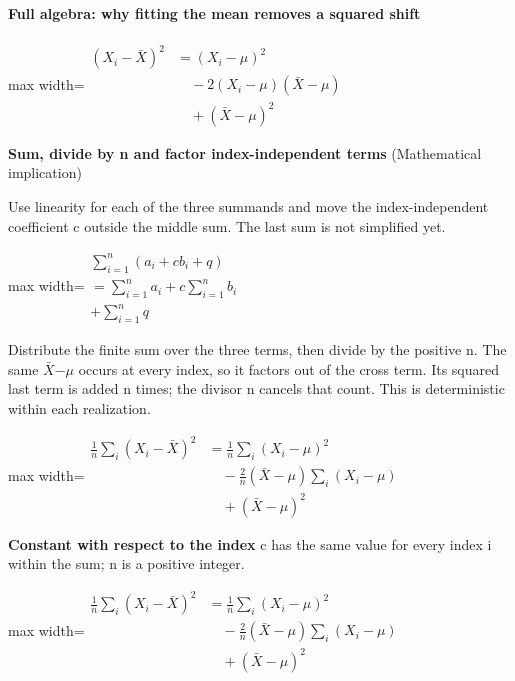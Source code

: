 \documentclass[11pt,a4paper]{article}
\begin{document}
\paragraph{Full algebra: why fitting the mean removes a squared shift}
\begin{center}\begin{adjustbox}{max width=\linewidth}$\displaystyle \begin{aligned}(X_i-\bar X)^2&=(X_i-\mu)^2\\&\quad-2(X_i-\mu)(\bar X-\mu)\\&\quad+(\bar X-\mu)^2\end{aligned}$\end{adjustbox}\end{center}
\noindent\textbf{Sum, divide by n and factor index-independent terms} (Mathematical implication)\par
Use linearity for each of the three summands and move the index-independent coefficient c outside the middle sum. The last sum is not simplified yet.
\begin{center}\begin{adjustbox}{max width=\linewidth}$\displaystyle \begin{gathered}\sum_{i=1}^n(a_i+cb_i+q)\\=\sum_{i=1}^n a_i+c\sum_{i=1}^n b_i\\+\sum_{i=1}^n q\end{gathered}$\end{adjustbox}\end{center}

Distribute the finite sum over the three terms, then divide by the positive n. The same \ensuremath{\bar{X}}\ensuremath{-}\ensuremath{\mu} occurs at every index, so it factors out of the cross term. Its squared last term is added n times; the divisor n cancels that count. This is deterministic within each realization.
\begin{center}\begin{adjustbox}{max width=\linewidth}$\displaystyle \begin{aligned}\frac1n\sum_i(X_i-\bar X)^2&=\frac1n\sum_i(X_i-\mu)^2\\&\quad-\frac2n(\bar X-\mu)\sum_i(X_i-\mu)\\&\quad+(\bar X-\mu)^2\end{aligned}$\end{adjustbox}\end{center}

\par\textbf{Constant with respect to the index} c has the same value for every index i within the sum; n is a positive integer.
\begin{center}\begin{adjustbox}{max width=\linewidth}$\displaystyle \begin{aligned}\frac1n\sum_i(X_i-\bar X)^2&=\frac1n\sum_i(X_i-\mu)^2\\&\quad-\frac2n(\bar X-\mu)\sum_i(X_i-\mu)\\&\quad+(\bar X-\mu)^2\end{aligned}$\end{adjustbox}\end{center}
\end{document}
